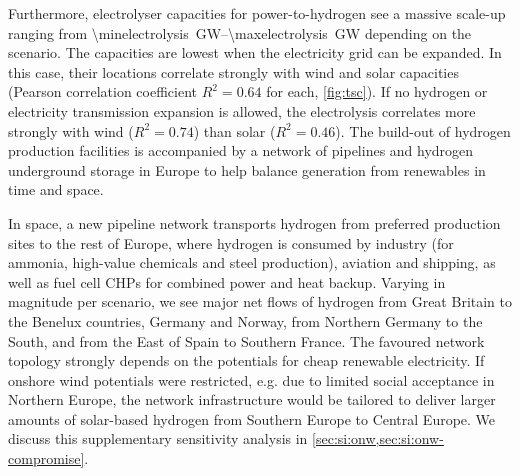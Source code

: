 Furthermore, electrolyser capacities for power-to-hydrogen see a massive
scale-up ranging from \SIrange{\minelectrolysis}{\maxelectrolysis}{\giga\watt}
depending on the scenario. The capacities are lowest when the electricity grid
can be expanded. In this case, their locations correlate strongly with wind and
solar capacities (Pearson correlation coefficient $R^2=0.64$ for each,
\cref{fig:tsc}). If no hydrogen or electricity transmission expansion is
allowed, the electrolysis correlates more strongly with wind ($R^2=0.74$) than
solar ($R^2=0.46$). The build-out of hydrogen production facilities is
accompanied by a network of pipelines and hydrogen underground storage in Europe
to help balance generation from renewables in time and space.

In space, a new pipeline network transports hydrogen from preferred production
sites to the rest of Europe, where hydrogen is consumed by industry (for
ammonia, high-value chemicals and steel production), aviation and shipping, as
well as fuel cell CHPs for combined power and heat backup. Varying in magnitude
per scenario, we see major net flows of hydrogen from Great Britain to the
Benelux countries, Germany and Norway, from Northern Germany to the South, and
from the East of Spain to Southern France. The favoured network topology
strongly depends on the potentials for cheap renewable electricity. If onshore
wind potentials were restricted, e.g. due to limited social acceptance in
Northern Europe, the network infrastructure would be tailored to deliver larger
amounts of solar-based hydrogen from Southern Europe to Central Europe. We
discuss this supplementary sensitivity analysis in
\cref{sec:si:onw,sec:si:onw-compromise}.


